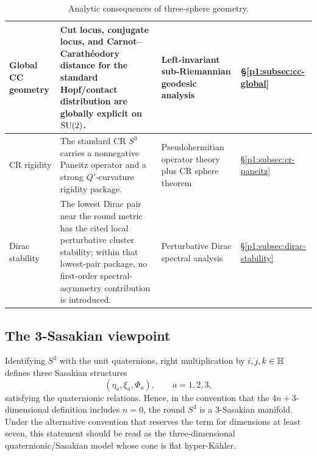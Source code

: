 \documentclass[11pt]{article}
\begin{document}
\begin{table}[p]
\begin{tabular}{|
  L{2.4cm}|
  L{\dimexpr\linewidth-2.4cm-4.0cm-1.0cm-8\arrayrulewidth\relax}|
  L{4.0cm}|
  C{1.0cm}|
}
Global CC geometry
& Cut locus, conjugate locus, and Carnot--\allowbreak Carath\'eodory distance
  for the standard Hopf/contact distribution are globally explicit on
  \(\mathrm{SU}(2)\).
& Left-invariant sub-\allowbreak Riemannian geodesic analysis
& \S\ref{p1:subsec:cc-global} \\
\hline

CR rigidity
& The standard CR \(S^3\) carries a nonnegative Paneitz operator and a strong
  \(Q'\)-curvature rigidity package.
& Pseudohermitian operator theory plus CR sphere theorem
& \S\ref{p1:subsec:cr-paneitz} \\
\hline

Dirac stability
& The lowest Dirac pair near the round metric has the cited local perturbative
  cluster stability; within that lowest-pair package, no first-order
  spectral-asymmetry contribution is introduced.
& Perturbative Dirac spectral analysis
& \S\ref{p1:subsec:dirac-stability} \\
\hline

\end{tabular}

\caption[Analytic consequences of three-sphere geometry]{Analytic consequences of three-sphere geometry.}
\label{p1:tab:analytic-consequences}
\endgroup
\end{table}


\subsection{The 3-Sasakian viewpoint}
\label{p1:subsec:3sasakian}

\begin{theorem}
\label{p1:thm:round-s3-3sasakian-model}
Identifying \(S^3\) with the unit quaternions, right multiplication by
\(i,j,k\in\mathbb{H}\) defines three Sasakian structures
\[
(\eta_a,\xi_a,\Phi_a),\qquad a=1,2,3,
\]
satisfying the quaternionic relations. Hence, in the convention that the
\(4n+3\)-dimensional definition includes \(n=0\), the round \(S^3\) is a
3-Sasakian manifold.  Under the alternative convention that reserves the term
for dimensions at least seven, this statement should be read as the
three-dimensional quaternionic/Sasakian model whose cone is flat hyper-K\"ahler.
\end{theorem}
\end{document}
